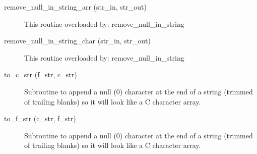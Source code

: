 \begin{description}
\label{r:remove.null.in.string.arr}
\item[remove_null_in_string_arr (str_in, str_out)] \Newline 
This routine overloaded by:
       remove_null_in_string

\label{r:remove.null.in.string.char}
\item[remove_null_in_string_char (str_in, str_out)] \Newline 
This routine overloaded by:
       remove_null_in_string

\label{r:to.c.str}
\item[to_c_str (f_str, c_str)] \Newline 
Subroutine to append a null (0) character at the end of a string (trimmed
of trailing blanks) so it will look like a C character array. 

\label{r:to.f.str}
\item[to_f_str (c_str, f_str)] \Newline 
Subroutine to append a null (0) character at the end of a string (trimmed
of trailing blanks) so it will look like a C character array. 

\end{description}

